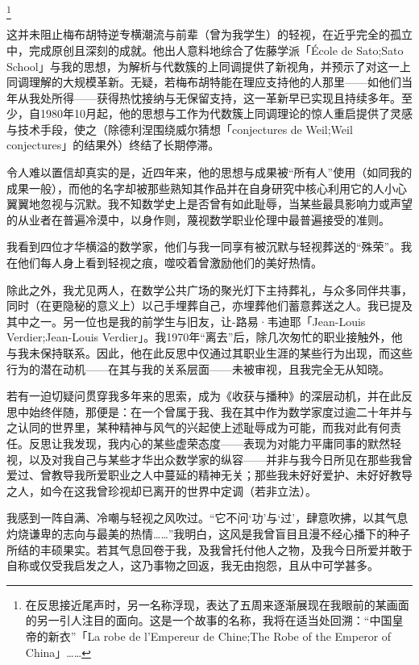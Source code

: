 \footnote{在反思接近尾声时，另一名称浮现，表达了五周来逐渐展现在我眼前的某画面的另一引人注目的面向。这是一个故事的名称，我将在适当处回溯：“中国皇帝的新衣”「La robe de l'Empereur de Chine;The Robe of the Emperor of China」……}

这并未阻止梅布胡特逆专横潮流与前辈（曾为我学生）的轻视，在近乎完全的孤立中，完成原创且深刻的成就。他出人意料地综合了佐藤学派「École de Sato;Sato School」与我的思想，为解析与代数簇的上同调提供了新视角，并预示了对这一上同调理解的大规模革新。无疑，若梅布胡特能在理应支持他的人那里——如他们当年从我处所得——获得热忱接纳与无保留支持，这一革新早已实现且持续多年。至少，自1980年10月起，他的思想与工作为代数簇上同调理论的惊人重启提供了灵感与技术手段，使之（除德利涅围绕威尔猜想「conjectures de Weil;Weil conjectures」的结果外）终结了长期停滞。

令人难以置信却真实的是，近四年来，他的思想与成果被“所有人”使用（如同我的成果一般），而他的名字却被那些熟知其作品并在自身研究中核心利用它的人小心翼翼地忽视与沉默。我不知数学史上是否曾有如此耻辱，当某些最具影响力或声望的从业者在普遍冷漠中，以身作则，蔑视数学职业伦理中最普遍接受的准则。

我看到四位才华横溢的数学家，他们与我一同享有被沉默与轻视葬送的“殊荣”。我在他们每人身上看到轻视之痕，噬咬着曾激励他们的美好热情。

除此之外，我尤见两人，在数学公共广场的聚光灯下主持葬礼，与众多同伴共事，同时（在更隐秘的意义上）以己手埋葬自己，亦埋葬他们蓄意葬送之人。我已提及其中之一。另一位也是我的前学生与旧友，让-路易·韦迪耶「Jean-Louis Verdier;Jean-Louis Verdier」。我1970年“离去”后，除几次匆忙的职业接触外，他与我未保持联系。因此，他在此反思中仅通过其职业生涯的某些行为出现，而这些行为的潜在动机——在其与我的关系层面——未被审视，且我完全无从知晓。

若有一迫切疑问贯穿我多年来的思索，成为《收获与播种》的深层动机，并在此反思中始终伴随，那便是：在一个曾属于我、我在其中作为数学家度过逾二十年并与之认同的世界里，某种精神与风气的兴起使上述耻辱成为可能，而我对此有何责任。反思让我发现，我内心的某些虚荣态度——表现为对能力平庸同事的默然轻视，以及对我自己与某些才华出众数学家的纵容——并非与我今日所见在那些我曾爱过、曾教导我所爱职业之人中蔓延的精神无关；那些我未好好爱护、未好好教导之人，如今在这我曾珍视却已离开的世界中定调（若非立法）。

我感到一阵自满、冷嘲与轻视之风吹过。“它不问‘功’与‘过’，肆意吹拂，以其气息灼烧谦卑的志向与最美的热情……”我明白，这风是我曾盲目且漫不经心播下的种子所结的丰硕果实。若其气息回卷于我，及我曾托付他人之物，及我今日所爱并敢于自称或仅受我启发之人，这乃事物之回返，我无由抱怨，且从中可学甚多。